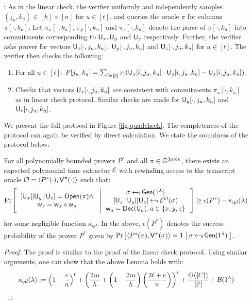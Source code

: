 : As in the linear check, the
verifier uniformly and independently samples $(j_u,k_u)\in [h]\times [n]$ for
$u\in [t]$, and queries the oracle $\pi$ for columns $\pi[\cdot,k_u]$. Let
$\pi_x[\cdot,k_u]$, $\pi_y[\cdot,k_u]$ and $\pi_z[\cdot,k_u]$ denote the parse
of $\pi[\cdot,k_u]$ into commitments corresponding to $\mathsf{U}_x,\mathsf{U}_y$ and
$\mathsf{U}_z$ respectively. Further, the verifier asks prover for vectors
$\mathsf{U}_x[\cdot,j_u,k_u]$, $\mathsf{U}_y[\cdot,j_u,k_u]$ and $\mathsf{U}_z[\cdot,j_u,k_u]$
for $u\in [t]$. The verifier then checks the following:
\begin{enumerate}[{\rm (i)}]
\item For all $u\in [t]$: $P[j_u,k_u]=\sum_{i\in
[p]}r_i(\mathsf{U}_x[i,j_u,k_u]\cdot\mathsf{U}_y[i,j_u,k_u]-\mathsf{U}_z[i,j_u,k_u])$.
\item Checks that vectors $\mathsf{U}_x[\cdot,j_u,k_u]$ are consistent with
commitments $\pi_x[\cdot,k_u]$ as in linear check protocol. Similar checks are
made for $\mathsf{U}_y[\cdot,j_u,k_u]$ and $\mathsf{U}_z[\cdot,j_u,k_u]$.
\end{enumerate}
We present the full protocol in Figure \ref{fig:quadcheck}. The completeness of
the protocol can again be verified by direct calculation. We state the soundness
of the protocol below:
\begin{lemma}[Soundness]\label{lem:quadcheck_sound}
For all polynomially bounded provers $P^\ast$ and all $\pi\in \mathbb{G}^{3p\times n}$,
there exists an expected polynomial time extractor $\mathcal{E}$ with rewinding access
to the transcript oracle $\mathcal{O}=\langle P^\ast(\cdot),\mathsf{V}^{\pi}(\cdot)\rangle$
such that:
{\small
\begin{align*}
\condprob{
\begin{array}{c}
{[}\ewit_x||\ewit_y||\ewit_z{]}=\open(\pi)\wedge \\
\wit_z=\wit_x\circ\wit_y
\end{array}
}{
\begin{array}{c}
\sigma\sample \gen(\secparam) \\
{[}\ewit_x||\ewit_y||\ewit_z{]}\sample \extr^{\mc{O}}(\sigma)\\
\wit_a=\dec(\ewit_a), a\in \{x,y,z\}
\end{array}
}\geq \epsilon(P^\ast) - \kappa_{\rm qd}(\secpar)
\end{align*}
}
for some negligible function $\kappa_{qd}$. In the above, $\epsilon(P^\ast)$
denotes the success probability of the prover $P^\ast$ given by
$\condprob{\innp{P^\ast(\sigma)}{\verifier^\pi(\sigma)}=1}{\sigma\sample
\gen(\secparam)}$.
\end{lemma}
\begin{proof}
The proof is similar to the proof of the linear check protocol. Using similar
arguments, one can show that the above Lemma holds with:
{\small
\begin{equation*}
\kappa_{qd}(\lambda) := \left(1-\frac{e}{n}\right)^t +
\left(\frac{2m}{h}+\left(1-\frac{2m}{h}\right)\left(\frac{2\ell+e}{n}\right)\right)^t
+ \frac{O(|C|)}{|\mathbb{F}|} + \mathcal{B}(1^{\lambda})
\end{equation*}
}
\end{proof}

